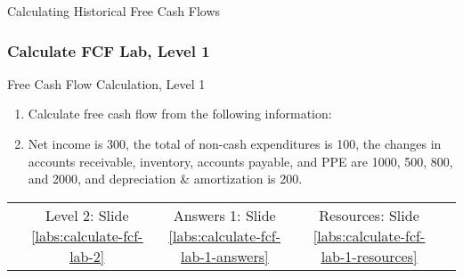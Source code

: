 \documentclass[handout, 11pt]{beamer}
\begin{document}
\begin{section}{Calculating Historical Free Cash Flows}
\begin{frame}
\frametitle{Calculate FCF Lab, Level 1}
{
\begin{block}{Free Cash Flow Calculation, Level 1}
\begin{enumerate}
\item Calculate free cash flow from the following information:
\item Net income is 300, the total of non-cash expenditures is 100, the changes in accounts receivable, inventory, accounts payable, and PPE are 1000, 500, 800, and 2000, and depreciation \& amortization is 200.
\end{enumerate}
\vfill
\begin{tabular*}{\textwidth}{@{\extracolsep{\fill}}ccccc}
\toprule
\hfill & Level 2: Slide \textcolor{blue}{\underline{\ref{labs:calculate-fcf-lab-2}}} & Answers 1: Slide \textcolor{blue}{\underline{\ref{labs:calculate-fcf-lab-1-answers}}} & Resources: Slide \textcolor{blue}{\underline{\ref{labs:calculate-fcf-lab-1-resources}}} & \hfill\\

\end{tabular*}
\end{block}
}
\label{labs:calculate-fcf-lab-1}
\end{frame}
\end{section}
\end{document}
